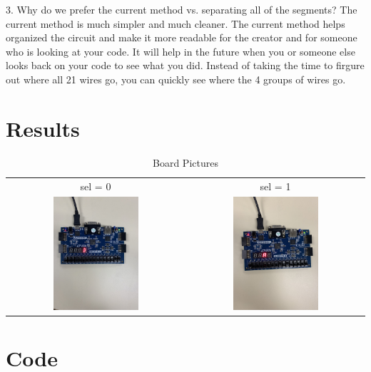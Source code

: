 \documentclass[11pt]{article}
\begin{document}
3. Why do we prefer the current method vs. separating all of the segments? \newline
The current method is much simpler and much cleaner. The current method helps organized the circuit and make it more readable for the creator and for someone who is looking at your code. It will help in the future when you or someone else looks back on your code to see what you did. Instead of taking the time to firgure out where all 21 wires go, you can quickly see where the 4 groups of wires go. \newline


\section*{Results}

\begin{table}[h]\centering
	\begin{tabular}{cc}
		sel = 0 & sel = 1 \\
		\includegraphics [width=0.5\textwidth,trim=0 0 0 0, clip, angle = 270]{Basys3_pic0} &
		\includegraphics [width=0.5\textwidth,trim=0 0 0 0, clip, angle = 270]{Basys3_pic1} \\
	\end{tabular}
	\caption{Board Pictures}
	\label{fig:sim_with_table}
\end{table}




\section*{Code}
\end{document}
